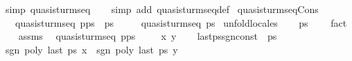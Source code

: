 \begin{isabellebody}
\isanewline
{}\isamarkupfalse%
\ {\isacharbrackleft}simp{\isacharbrackright}{\isacharcolon}\ {\isachardoublequoteopen}{\isasymnot}quasi{\isacharunderscore}sturm{\isacharunderscore}seq\ {\isacharbrackleft}{\isacharbrackright}{\isachardoublequoteclose}%
\isadelimproof
\ %
\endisadelimproof
%
\isatagproof
{}\isamarkupfalse%
\ {\isacharparenleft}simp\ add{\isacharcolon}\ quasi{\isacharunderscore}sturm{\isacharunderscore}seq{\isacharunderscore}def{\isacharparenright}%
\endisatagproof
{\isafoldproof}%
%
\isadelimproof
%
\endisadelimproof
\isanewline
\isanewline
{}\isamarkupfalse%
\ quasi{\isacharunderscore}sturm{\isacharunderscore}seq{\isacharunderscore}Cons{\isacharcolon}\isanewline
\ \ \ {\isachardoublequoteopen}quasi{\isacharunderscore}sturm{\isacharunderscore}seq\ {\isacharparenleft}p{\isacharhash}ps{\isacharparenright}{\isachardoublequoteclose}\ \ {\isachardoublequoteopen}ps\ {\isasymnoteq}\ {\isacharbrackleft}{\isacharbrackright}{\isachardoublequoteclose}\isanewline
\ \ \ {\isachardoublequoteopen}quasi{\isacharunderscore}sturm{\isacharunderscore}seq\ ps{\isachardoublequoteclose}\isanewline
%
\isadelimproof
%
\endisadelimproof
%
\isatagproof
{}\isamarkupfalse%
\ {\isacharparenleft}unfold{\isacharunderscore}locales{\isacharparenright}\isanewline
\ \ \isamarkupfalse%
\ {\isachardoublequoteopen}ps\ {\isasymnoteq}\ {\isacharbrackleft}{\isacharbrackright}{\isachardoublequoteclose}\ \isamarkupfalse%
\ fact\isanewline
{}\isamarkupfalse%
\isanewline
\ \ \isamarkupfalse%
\ assms{\isacharparenleft}{}{\isacharparenright}\ \isamarkupfalse%
\ quasi{\isacharunderscore}sturm{\isacharunderscore}seq\ {\isachardoublequoteopen}p{\isacharhash}ps{\isachardoublequoteclose}\ \isacommand{{\isachardot}}\isamarkupfalse%
\isanewline
\ \ \isamarkupfalse%
\ x\ y\isanewline
\ \ \isamarkupfalse%
\ last{\isacharunderscore}ps{\isacharunderscore}sgn{\isacharunderscore}const\ \ {\isacharbackquoteopen}ps\ {\isasymnoteq}\ {\isacharbrackleft}{\isacharbrackright}{\isacharbackquoteclose}\ \isanewline
\ \ \ \ \ \ \isamarkupfalse%
\ {\isachardoublequoteopen}sgn\ {\isacharparenleft}poly\ {\isacharparenleft}last\ ps{\isacharparenright}\ x{\isacharparenright}\ {\isacharequal}\ sgn\ {\isacharparenleft}poly\ {\isacharparenleft}last\ ps{\isacharparenright}\ y{\isacharparenright}{\isachardoublequoteclose}\ \isamarkupfalse%

\end{isabellebody}
